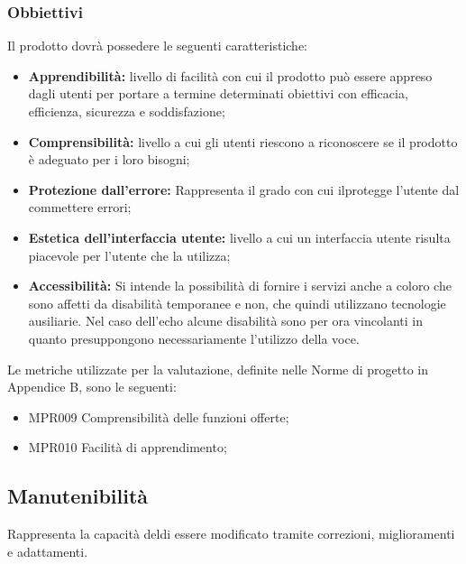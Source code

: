 \subsubsection{Obbiettivi } Il prodotto dovrà possedere le seguenti caratteristiche:
    \begin{itemize}
	\item \textbf{Apprendibilità:} livello di facilità con cui il prodotto può essere appreso dagli utenti per portare a termine determinati obiettivi con efficacia, efficienza, sicurezza e soddisfazione;
	\item \textbf{Comprensibilità:} livello a cui gli utenti riescono a riconoscere se il prodotto è adeguato per i loro bisogni;
    \item \textbf{Protezione dall'errore:} Rappresenta il grado con cui ilprotegge l'utente dal commettere errori;
	\item \textbf{Estetica dell'interfaccia utente:} livello a cui un interfaccia utente risulta piacevole per l'utente che la utilizza;
	\item \textbf{Accessibilità:} Si intende la possibilità di fornire i servizi anche a coloro che sono affetti da disabilità temporanee e non, che quindi utilizzano tecnologie ausiliarie.
		Nel caso dell'echo alcune disabilità sono per ora vincolanti in quanto presuppongono necessariamente l'utilizzo della voce.
	\end{itemize}
	Le metriche utilizzate per la valutazione, definite nelle Norme di progetto in Appendice B, sono le seguenti:
	\begin{itemize}
		\item MPR009 Comprensibilità delle funzioni offerte;
		\item MPR010 Facilità di apprendimento;
	\end{itemize}

\subsection{Manutenibilità}
Rappresenta la capacità deldi essere modificato tramite correzioni, miglioramenti e adattamenti.
